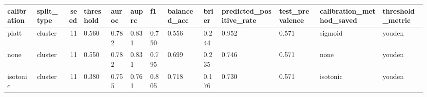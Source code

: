 \begin{tabular}{llrllllllllll}
\toprule
calibration & split_type & seed & threshold & auroc & auprc & f1 & balanced_acc & brier & predicted_positive_rate & test_prevalence & calibration_method_saved & threshold_metric \\
\midrule
platt & cluster & 11 & 0.560 & 0.782 & 0.831 & 0.750 & 0.556 & 0.244 & 0.952 & 0.571 & sigmoid & youden \\
none & cluster & 11 & 0.550 & 0.782 & 0.831 & 0.795 & 0.699 & 0.235 & 0.746 & 0.571 & none & youden \\
isotonic & cluster & 11 & 0.380 & 0.755 & 0.761 & 0.805 & 0.718 & 0.176 & 0.730 & 0.571 & isotonic & youden \\
\bottomrule
\end{tabular}
